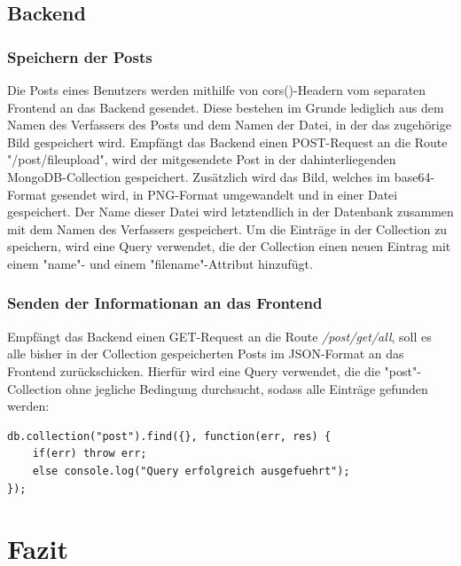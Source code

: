 \documentclass[12pt,a4paper]{report}
\begin{document}
\section{Backend}

\subsection{Speichern der Posts}
Die Posts eines Benutzers werden mithilfe von cors()-Headern vom separaten Frontend an das Backend gesendet. Diese bestehen im Grunde lediglich aus dem Namen des Verfassers des Posts und dem Namen der Datei, in der das zugehörige Bild gespeichert wird. Empfängt das Backend einen POST-Request an die Route "/post/fileupload", wird der mitgesendete Post in der dahinterliegenden MongoDB-Collection gespeichert. Zusätzlich wird das Bild, welches im base64-Format gesendet wird, in PNG-Format umgewandelt und in einer Datei gespeichert. Der Name dieser Datei wird letztendlich in der Datenbank zusammen mit dem Namen des Verfassers gespeichert.
Um die Einträge in der Collection zu speichern, wird eine Query verwendet, die der Collection einen neuen Eintrag mit einem "name"- und einem "filename"-Attribut hinzufügt.

\subsection{Senden der Informationan an das Frontend}
Empfängt das Backend einen GET-Request an die Route \textit{/post/get/all}, soll es alle bisher in der Collection gespeicherten Posts im JSON-Format an das Frontend zurückschicken. Hierfür wird eine Query verwendet, die die "post"-Collection ohne jegliche Bedingung durchsucht, sodass alle Einträge gefunden werden:

\begin{verbatim}
db.collection("post").find({}, function(err, res) {
    if(err) throw err;
    else console.log("Query erfolgreich ausgefuehrt");
});
\end{verbatim}

\newpage
\chapter{Fazit}
\end{document}
